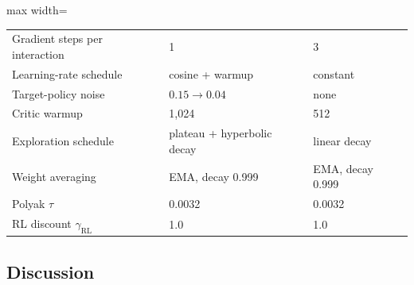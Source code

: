 \documentclass[a4paper,fleqn]{cas-dc}
\begin{document}
\begin{table}[htbp]
\begin{adjustbox}{max width=\linewidth}
\begin{tabular}{lll}
            Gradient steps per interaction    & 1                                 & 3                                 \\
            Learning-rate schedule            & cosine + warmup                   & constant                          \\
            Target-policy noise               & $0.15 \to 0.04$                   & none                              \\
            Critic warmup                     & 1{,}024                           & 512                               \\
            Exploration schedule              & plateau + hyperbolic decay        & linear decay                      \\
            Weight averaging                  & EMA, decay 0.999                  & EMA, decay 0.999                  \\
            Polyak $\tau$                     & 0.0032                            & 0.0032                            \\
            RL discount $\gamma_{\mathrm{RL}}$ & 1.0                              & 1.0                               \\
            \bottomrule
        \end{tabular}
    \end{adjustbox}
\end{table}

\subsection{Discussion}
\end{document}
